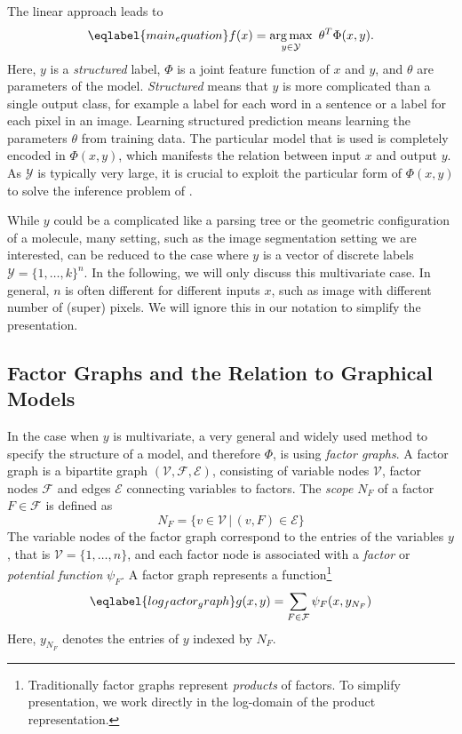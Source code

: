 The linear approach leads to
\begin{equation}\eqlabel{main_equation}
    f(x) = \argmax_{y \in \mathcal{Y}}\  \theta^T \Phi(x, y).
\end{equation}
Here, $y$ is a \emph{structured} label, $\Phi$ is a joint feature function of
$x$ and $y$, and $\theta$ are parameters of the model. \emph{Structured} means
that $y$ is more complicated than a single output class, for example a label
for each word in a sentence or a label for each pixel in an image.
Learning structured prediction means learning the parameters $\theta$ from
training data.  The particular model that is used is completely encoded in
$\Phi(x, y)$, which manifests the relation between input $x$ and output $y$. As
$\mathcal{Y}$ is typically very large, it is crucial to exploit the particular
form of $\Phi(x, y)$ to solve the inference problem of .

While $y$ could be a complicated like a parsing tree or the geometric
configuration of a molecule, many setting, such as the image segmentation
setting we are interested, can be reduced to the case where $y$ is a vector of
discrete labels $\mathcal{Y} = \{1, \dotsc, k\}^n$.
In the following, we will only discuss this multivariate case. In general, $n$
is often different for different inputs $x$, such as image with different
number of (super) pixels.  We will ignore this in our notation to simplify the
presentation.

\subsection{Factor Graphs and the Relation to Graphical Models}
In the case when $y$ is multivariate, a very general and widely used method to
specify the structure of a model, and therefore $\Phi$, is using \emph{factor
graphs}. A factor graph is a bipartite graph $(\mathcal{V}, \mathcal{F},
\mathcal{E})$, consisting of variable nodes $\mathcal{V}$, factor nodes
$\mathcal{F}$ and edges $\mathcal{E}$ connecting variables to factors. The
\emph{scope} $N_F$ of a factor $F \in \mathcal{F}$ is defined as
\begin{equation}
    N_F = \{ v \in \mathcal{V} \,|\, (v,F) \in \mathcal{E} \}
\end{equation}
The variable nodes of the factor graph correspond to the entries of the
variables $y$, that is $\mathcal{V} = \{1, \dotsc, n\}$, and each factor node
is associated with a \emph{factor} or \emph{potential function} $\psi_F$.
A factor graph represents a function\footnote{Traditionally factor graphs
 represent \emph{products} of factors.  To simplify presentation, we work
directly in the log-domain of the product representation.}
\begin{equation}\eqlabel{log_factor_graph}
    g(x, y) = \sum_{F \in \mathcal{F}} \psi_F(x, y_{N_F})
\end{equation}
Here, $y_{N_F}$ denotes the entries of $y$ indexed by $N_F$.


